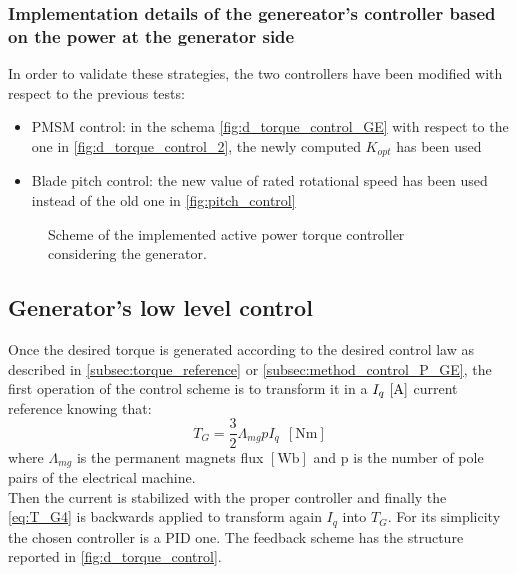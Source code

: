 \subsubsection[Implementation details]{Implementation details of the genereator's controller based on the power at the generator side}
In order to validate these strategies, the two controllers have been modified with respect to the previous tests:
\begin{itemize}
  \item PMSM control: in the schema \autoref{fig:d_torque_control_GE} with respect to the one in \autoref{fig:d_torque_control_2}, the newly computed  $K_{opt}$ has been used%
  \item Blade pitch control: the new value of rated rotational speed has been used instead of the old one in \autoref{fig:pitch_control}
\end{itemize}

\begin{figure}[htb]
  \centering
  
  \caption{Scheme of the implemented active power torque controller considering the generator.}
  \label{fig:d_torque_control_GE}
\end{figure}

\subsection{Generator's low level control}\label{subsec:generator_low_level-control}
Once the desired torque is generated according to the desired control law as described in \autoref{subsec:torque_reference} or \autoref{subsec:method_control_P_GE}, the first operation of the control scheme is to transform it in a $I_q \, \left[\si{\ampere}\right]$ current reference knowing that:
\begin{equation}
    T_G = \frac{3}{2}\Lambda_{mg} p I_q \ \ \left[\si{\newton\meter}\right]
    \label{eq:T_G4}
\end{equation}
where $\Lambda_{mg}$ is the permanent magnets flux $\left[\si{\weber}\right]$ and p is the number of pole pairs of the electrical machine.\\
Then the current is stabilized with the proper controller and finally the \autoref{eq:T_G4} is backwards applied to transform again $I_q$ into $T_G$. For its simplicity the chosen controller is a \acrfull{PID} one. The feedback scheme has the structure reported in \autoref{fig:d_torque_control}.


